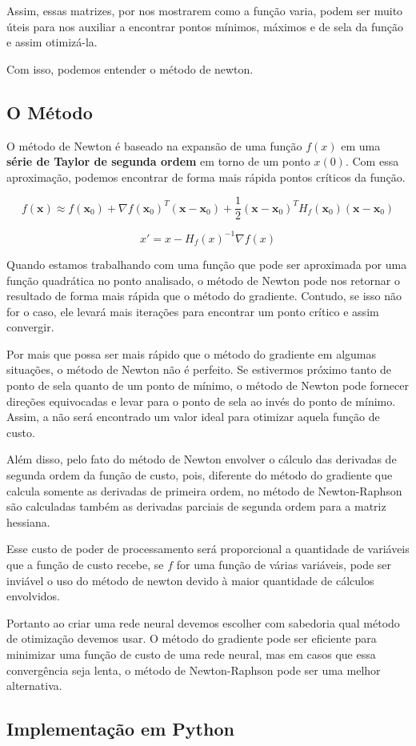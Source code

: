 Assim, essas matrizes, por nos mostrarem como a função varia, podem ser muito úteis para nos auxiliar a encontrar pontos mínimos, máximos e de sela da função e assim otimizá-la.

Com isso, podemos entender o método de newton.

\subsection{O Método}

O método de Newton é baseado na expansão de uma função $f(x)$ em uma \textbf{série de Taylor de segunda ordem} em torno de um ponto $x(0)$. Com essa aproximação, podemos encontrar de forma mais rápida pontos críticos da função.

    \begin{equation}
         f(\mathbf{x}) \approx f(\mathbf{x}_0) + \nabla f(\mathbf{x}_0)^T (\mathbf{x} - \mathbf{x}_0) + \frac{1}{2} (\mathbf{x} - \mathbf{x}_0)^T H_f(\mathbf{x}_0) (\mathbf{x} - \mathbf{x}_0)
    \end{equation}

    \begin{equation}
         x' = x - H_f(x)^{-1} \nabla f(x)
    \end{equation}

Quando estamos trabalhando com uma função que pode ser aproximada por uma função quadrática no ponto analisado, o método de Newton pode nos retornar o resultado de forma mais rápida que o método do gradiente. Contudo, se isso não for o caso, ele levará mais iterações para encontrar um ponto crítico e assim convergir.

Por mais que possa ser mais rápido que o método do gradiente em algumas situações, o método de Newton não é perfeito. Se estivermos próximo tanto de ponto de sela quanto de um ponto de mínimo, o método de Newton pode fornecer direções equivocadas e levar para o ponto de sela ao invés do ponto de mínimo. Assim, a não será encontrado um valor ideal para otimizar aquela função de custo.

Além disso, pelo fato do método de Newton envolver o cálculo das derivadas de segunda ordem da função de custo, pois, diferente do método do gradiente que calcula somente as derivadas de primeira ordem, no método de Newton-Raphson são calculadas também as derivadas parciais de segunda ordem para a matriz hessiana.

 Esse custo de poder de processamento será proporcional a quantidade de variáveis que a função de custo recebe, se $f$ for uma função de várias variáveis, pode ser inviável o uso do método de newton devido à maior quantidade de cálculos envolvidos.

Portanto ao criar uma rede neural devemos escolher com sabedoria qual método de otimização devemos usar. O método do gradiente pode ser eficiente para minimizar uma função de custo de uma rede neural, mas em casos que essa convergência seja lenta, o método de Newton-Raphson pode ser uma melhor alternativa.

\subsection{Implementação em Python}

